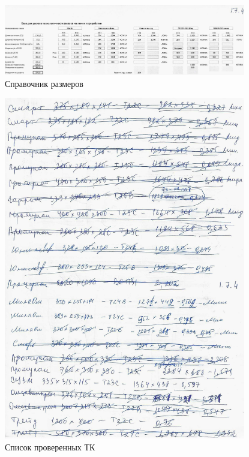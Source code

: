 \begin{figure}
\begin{center}
  \includegraphics[height=0.94\textheight, width=0.94\textwidth, keepaspectratio]{Pics 1/1.7.4 справочник для маршрутов_0001.jpg}
\end{center}
  \caption{Справочник размеров}
  \label{pic:1.7.4 справочник для маршрутов_0001}
\end{figure}

\begin{figure}
\begin{center}
  \includegraphics[height=0.94\textheight, width=0.94\textwidth, keepaspectratio]{Pics 1/1.7.4 список проверенных ТК_0001.jpg}
\end{center}
  \caption{Список проверенных ТК}
  \label{pic:1.7.4 список проверенных ТК_0001}
\end{figure}



